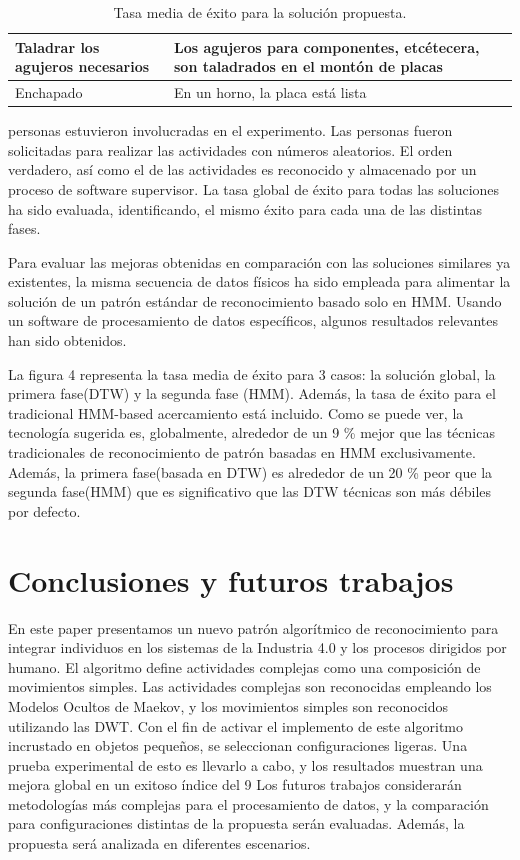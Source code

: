 \documentclass{article}
\begin{document}
\begin{table}[t]
\begin{center}
\begin{tabular}{ | p{4cm} | p{9cm} | }
			Taladrar los agujeros necesarios                   & Los agujeros para componentes, etcétecera, son taladrados en el montón de placas                                         \\ \hline
			Enchapado                                          & En un horno, la placa está lista                                                                                         \\ \hline
		\end{tabular}
	\end{center}
\caption{\label{fig:frog}Tasa media de éxito para la solución propuesta.}
\end{table}


 personas estuvieron involucradas en el experimento. Las personas fueron solicitadas para realizar las actividades con números aleatorios. El orden verdadero, así como el de las actividades es reconocido y almacenado por un proceso de software supervisor. La tasa global de éxito para todas las soluciones ha sido evaluada, identificando, el mismo éxito para cada una de las distintas fases.

Para evaluar las mejoras obtenidas en comparación con las soluciones similares ya existentes, la misma secuencia de datos físicos ha sido empleada para alimentar la solución de un patrón estándar de reconocimiento basado solo en HMM. Usando un software de procesamiento de datos específicos, algunos resultados relevantes han sido obtenidos.

La figura 4 representa la tasa media de éxito para 3 casos: la solución global, la primera fase(DTW) y la segunda fase (HMM). Además, la tasa de éxito para el tradicional HMM-based acercamiento está incluido. Como se puede ver, la tecnología sugerida es, globalmente, alrededor de un 9 \% mejor que  las técnicas tradicionales de reconocimiento de patrón basadas en HMM exclusivamente. Además, la primera fase(basada en DTW) es alrededor de un 20 \% peor que la segunda fase(HMM) que es significativo que las DTW técnicas son más débiles por defecto.


\section {Conclusiones y futuros trabajos}
En este paper presentamos un nuevo patrón algorítmico de reconocimiento para integrar individuos en los sistemas de la Industria 4.0 y los procesos dirigidos por humano. El algoritmo define actividades complejas como una composición de movimientos simples. Las actividades complejas son reconocidas empleando los Modelos Ocultos de Maekov, y los movimientos simples son reconocidos utilizando las DWT. Con el fin de activar el implemento de este algoritmo incrustado en objetos pequeños, se seleccionan configuraciones ligeras. Una prueba experimental de esto es llevarlo a cabo, y los resultados muestran una mejora global en un exitoso índice del 9%
Los futuros trabajos considerarán metodologías más complejas para el procesamiento de datos, y la comparación para configuraciones distintas de la propuesta serán evaluadas.
Además, la propuesta será analizada en diferentes escenarios.
\end{document}
